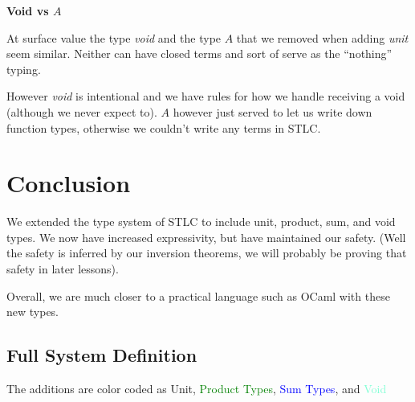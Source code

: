 \documentclass{lecturenotes}
\newcommand{\bl}[1]{\textcolor{blue}{#1}}
\newcommand{\g}[1]{\textcolor{Green}{#1}}
\newcommand{\re}[1]{\textcolor{BrickRed}{#1}}
\newcommand{\aq}[1]{\textcolor{Aquamarine}{#1}}
\begin{document}
\vspace{0.25cm} \noindent \textbf{Void vs $A$}

  At surface value the type \textit{void} and the type $A$ that we removed when adding \textit{unit} seem similar. 
    Neither can have closed terms and sort of serve as the ``nothing'' typing. 
  
  However \textit{void} is intentional and we have rules for how we handle receiving a void (although we never expect to). 
    $A$ however just served to let us write down function types, otherwise we couldn't write any terms in STLC.

\section{Conclusion }

We extended the type system of STLC to include unit, product, sum, and void types. 
  We now have increased expressivity, but have maintained our safety. (Well the safety is inferred by our inversion theorems, we will probably be proving that safety in later lessons). 

Overall, we are much closer to a practical language such as OCaml with these new types. 

\newpage

\subsection{Full System Definition} \label{sysdefn}

The additions are color coded as \re{Unit}, \g{Product Types}, \bl{Sum Types}, and \aq{Void}
\end{document}
